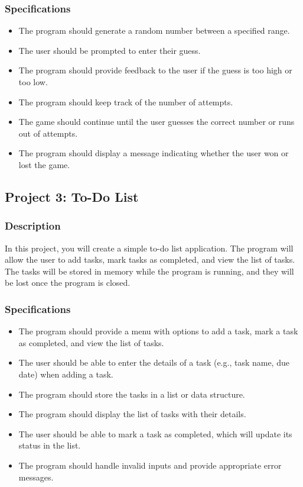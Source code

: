 \documentclass[12pt]{article}
\begin{document}
\subsubsection{Specifications}
\begin{itemize}
\item The program should generate a random number between a specified range.
\item The user should be prompted to enter their guess.
\item The program should provide feedback to the user if the guess is too high or too low.
\item The program should keep track of the number of attempts.
\item The game should continue until the user guesses the correct number or runs out of attempts.
\item The program should display a message indicating whether the user won or lost the game.
\end{itemize}

\newpage
\subsection{Project 3: To-Do List}

\subsubsection{Description}
In this project, you will create a simple to-do list application. The program will allow the user to add tasks, mark tasks as completed, and view the list of tasks. The tasks will be stored in memory while the program is running, and they will be lost once the program is closed.

\subsubsection{Specifications}
\begin{itemize}
\item The program should provide a menu with options to add a task, mark a task as completed, and view the list of tasks.
\item The user should be able to enter the details of a task (e.g., task name, due date) when adding a task.
\item The program should store the tasks in a list or data structure.
\item The program should display the list of tasks with their details.
\item The user should be able to mark a task as completed, which will update its status in the list.
\item The program should handle invalid inputs and provide appropriate error messages.
\end{itemize}
\end{document}
